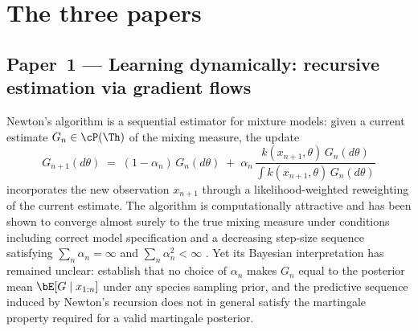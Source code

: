 \section{The three papers}
\label{sec:intro:papers}

\subsection{Paper~1 --- Learning dynamically: recursive estimation via gradient flows}
\label{subsec:intro:paper1}

Newton's algorithm \citep{NewtonRaftery1994} is a sequential estimator for
mixture models: given a current estimate $G_n \in \cP(\Th)$ of the mixing
measure, the update
\begin{equation}
  G_{n+1}(d\theta)
  \;=\;
  (1 - \alpha_n)\, G_n(d\theta)
  \;+\;
  \alpha_n\,
  \frac{k(x_{n+1}, \theta)\, G_n(d\theta)}
       {\displaystyle\int k(x_{n+1}, \theta)\, G_n(d\theta)}
  \label{eq:newton-recursion}
\end{equation}
incorporates the new observation $x_{n+1}$ through a likelihood-weighted
reweighting of the current estimate.  The algorithm is computationally
attractive and has been shown to converge almost surely to the true mixing
measure under conditions including correct model specification and a
decreasing step-size sequence satisfying $\sum_n \alpha_n = \infty$ and
$\sum_n \alpha_n^2 < \infty$ \citep{TokdarMartinGhosh2009}.  Yet its
Bayesian interpretation has remained unclear: \citet{FortiniPetrone2020}
establish that no choice of $\alpha_n$ makes $G_n$ equal to the posterior
mean $\bE[G \mid x_{1:n}]$ under any species sampling prior, and the
predictive sequence induced by Newton's recursion does not in general
satisfy the martingale property required for a valid martingale posterior.

